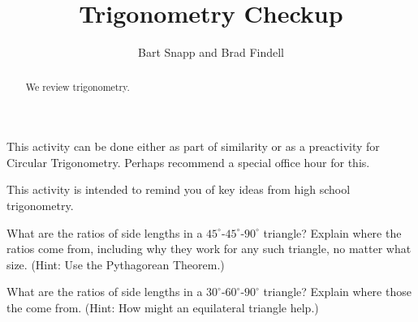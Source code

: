 \documentclass[nooutcomes]{ximera}
\title{Trigonometry Checkup}
\author{Bart Snapp and Brad Findell}
\begin{document}
\begin{abstract}
  We review trigonometry.
\end{abstract}
\maketitle

\begin{teachingnote}
This activity can be done either as part of similarity or as a preactivity for Circular Trigonometry.  Perhaps recommend a special office hour for this.  
\end{teachingnote}
This activity is intended to remind you of key ideas from high school trigonometry. 

\begin{problem}
What are the ratios of side lengths in a $45^\circ$-$45^\circ$-$90^\circ$ triangle?  Explain where the ratios come from, including why they work for any such triangle, no matter what size.  (Hint: Use the Pythagorean Theorem.)
\vfill
\end{problem}

\begin{problem}
What are the ratios of side lengths in a $30^\circ$-$60^\circ$-$90^\circ$ triangle?  Explain where those the come from.  (Hint: How might an equilateral triangle help.)
\vfill
\end{problem}

\newpage
\end{document}
